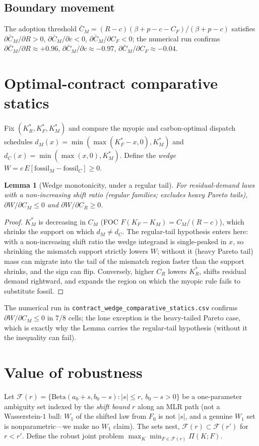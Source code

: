 \documentclass[11pt]{article}
\newtheorem{lemma}{Lemma}
\begin{document}
\subsection*{Boundary movement}
The adoption threshold $\bar C_M = (R-c)(\beta+p-c-C_F)/(\beta+p-c)$ satisfies
$\partial \bar C_M/\partial R > 0$, $\partial \bar C_M/\partial c < 0$,
$\partial \bar C_M/\partial C_F < 0$; the numerical run confirms
$\partial \bar C_M/\partial R \approx +0.96$,
$\partial \bar C_M/\partial c \approx -0.97$,
$\partial \bar C_M/\partial C_F \approx -0.04$.

\section{Optimal-contract comparative statics}
Fix $(K_R^\ast, K_F^\ast, K_M^\ast)$ and compare the myopic and
carbon-optimal dispatch schedules
$d_M(x) = \min(\max(K_F^\ast - x,0), K_M^\ast)$ and
$d_C(x) = \min(\max(x,0), K_M^\ast)$. Define the \emph{wedge}
$W = c\,E[\text{fossil}_M - \text{fossil}_C] \ge 0$.

\begin{lemma}[Wedge monotonicity, under a regular tail]\label{lem:wedge}
For residual-demand laws with a non-increasing shift ratio (regular families; excludes
heavy Pareto tails), $\partial W/\partial C_M \le 0$ and $\partial W/\partial C_R \ge 0$.
\end{lemma}

\begin{proof}
$K_M^\ast$ is decreasing in $C_M$ (FOC $F(K_F-K_M) = C_M/(R-c)$),
which shrinks the support on which $d_M \ne d_C$. The regular-tail hypothesis
enters here: with a non-increasing shift ratio the wedge integrand is single-peaked in
$x$, so shrinking the mismatch support strictly lowers $W$; without it (heavy Pareto tail)
mass can migrate into the tail of the mismatch region faster than the support shrinks, and
the sign can flip. Conversely, higher $C_R$ lowers $K_R^\ast$, shifts residual demand
rightward, and expands the region on which the myopic rule fails to substitute fossil.
\end{proof}

The numerical run in
\texttt{contract\_wedge\_comparative\_statics.csv} confirms
$\partial W/\partial C_M\le0$ in $7/8$ cells; the lone exception is the heavy-tailed
Pareto case, which is exactly why the Lemma carries the regular-tail hypothesis
(without it the inequality can fail).

\section{Value of robustness}
Let $\mathcal F(r) = \{\mathrm{Beta}(a_0+s, b_0-s) : |s| \le r,\ b_0-s>0\}$ be a
one-parameter ambiguity set indexed by the \emph{shift bound} $r$ along an MLR
path (not a Wasserstein-$1$ ball: $W_1$ of the shifted law from $F_0$ is not $|s|$,
and a genuine $W_1$ set is nonparametric---we make no $W_1$ claim). The sets nest,
$\mathcal F(r)\subset\mathcal F(r')$ for $r<r'$. Define the robust joint
problem $\max_{K}\min_{F \in \mathcal F(r)} \Pi(K;F)$.
\end{document}

